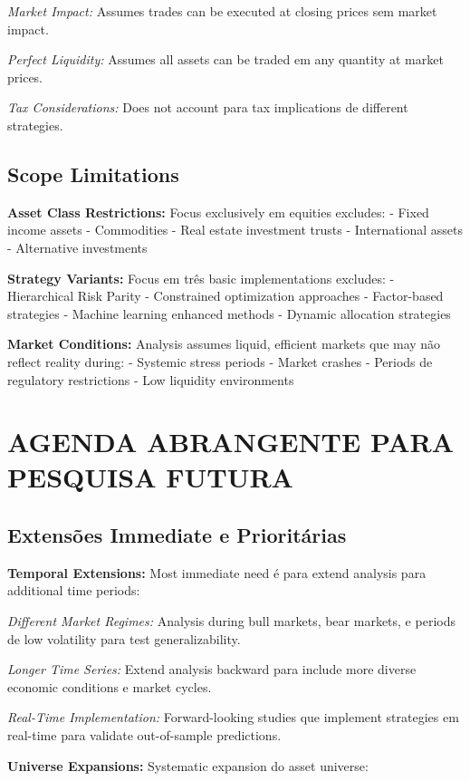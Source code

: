 \textit{Market Impact:} Assumes trades can be executed at closing prices sem market impact.

\textit{Perfect Liquidity:} Assumes all assets can be traded em any quantity at market prices.

\textit{Tax Considerations:} Does not account para tax implications de different strategies.

\subsection{Scope Limitations}

\textbf{Asset Class Restrictions:} Focus exclusively em equities excludes:
- Fixed income assets
- Commodities  
- Real estate investment trusts
- International assets
- Alternative investments

\textbf{Strategy Variants:} Focus em três basic implementations excludes:
- Hierarchical Risk Parity
- Constrained optimization approaches
- Factor-based strategies
- Machine learning enhanced methods
- Dynamic allocation strategies

\textbf{Market Conditions:} Analysis assumes liquid, efficient markets que may não reflect reality during:
- Systemic stress periods
- Market crashes
- Periods de regulatory restrictions
- Low liquidity environments

\section{AGENDA ABRANGENTE PARA PESQUISA FUTURA}

\subsection{Extensões Immediate e Prioritárias}

\textbf{Temporal Extensions:} Most immediate need é para extend analysis para additional time periods:

\textit{Different Market Regimes:} Analysis during bull markets, bear markets, e periods de low volatility para test generalizability.

\textit{Longer Time Series:} Extend analysis backward para include more diverse economic conditions e market cycles.

\textit{Real-Time Implementation:} Forward-looking studies que implement strategies em real-time para validate out-of-sample predictions.

\textbf{Universe Expansions:} Systematic expansion do asset universe:

